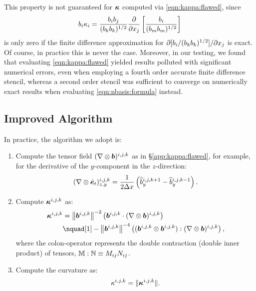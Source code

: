 This property is not guaranteed for $\bm{\kappa}$ computed via \autoref{eqn:kappa:flawed}, since
\begin{align}
    b_i \kappa_i
        = \frac{b_i b_j}{(b_k b_k)^{1/2}} \frac{\mpp}{\mpp x_j}\sbrac{\frac{b_i}{(b_m b_m)^{1/2}}}
\end{align}
is only zero if the finite difference approximation for $\partial [b_i / (b_k b_k)^{1/2}]/\partial x_j$ is exact. Of course, in practice this is never the case. Moreover, in our testing, we found that evaluating \autoref{eqn:kappa:flawed} yielded results polluted with significant numerical errors, even when employing a fourth order accurate finite difference stencil, whereas a second order stencil was sufficient to converge on numerically exact results when evaluating \autoref{eqn:nbasis:formula} instead.

\subsection{Improved Algorithm}
\label{app:kappa:improved}

In practice, the algorithm we adopt is:
\begin{enumerate}
    \item Compute the tensor field $(\nabla\otimes\bm{b})^{i,j,k}$ as in \S\ref{app:kappa:flawed}, for example, for the derivative of the $y$-component in the $z$-direction:
        \begin{align}
            (\nabla\otimes\hat{\bm{e}}_{t})^{i,j,k}_{z,y}
                = \frac{1}{2\Delta x} \left( \widehat{b}^{i,j,k+1}_y - \widehat{b}^{i,j,k-1}_y \right)
            .
        \end{align}
    \item Compute $\bm{\kappa}^{i,j,k}$ as:
        \begin{align}
            \mVector{\kappa}^{i,j,k}
                &= \left\|\mVector{b}^{i,j,k}\right\|^{-2} \rbrac{\mVector{b}^{i,j,k} \cdot (\nabla\otimes\mVector{b})^{i,j,k}} \nonumber\\
                &\nquad[1] - \left\|\mVector{b}^{i,j,k}\right\|^{-4} \rbrac{(\mVector{b}^{i,j,k}\otimes\mVector{b}^{i,j,k}) : (\nabla\otimes\mVector{b})^{i,j,k}}
            ,
        \end{align}
        where the colon-operator represents the double contraction (double inner product) of tensors, \ie $\mathbb{M}:\mathbb{N} \equiv M_{ij} N_{ij}$.
    \item Compute the curvature as:
        \begin{align}
            \kappa^{i,j,k}
                = \|\bm{\kappa}^{i,j,k}\|
            .
        \end{align}
\end{enumerate}

